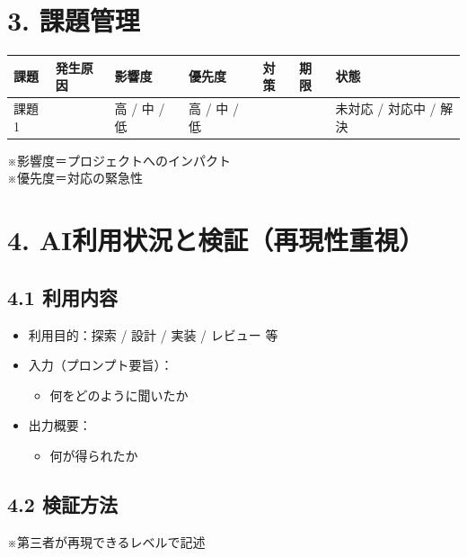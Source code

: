 \documentclass[a4paper,11pt]{ltjsarticle}
\begin{document}
\section{3. 課題管理}

\begin{longtable}{|p{2cm}|p{2.5cm}|p{1.5cm}|p{1.5cm}|p{3cm}|p{2cm}|p{2cm}|}
\hline
\rowcolor[gray]{0.9}
課題 & 発生原因 & 影響度 & 優先度 & 対策 & 期限 & 状態 \\
\hline
課題1 & & 高 / 中 / 低 & 高 / 中 / 低 & & & 未対応 / 対応中 / 解決 \\
\hline
\end{longtable}

\vspace{0.5em}
※影響度＝プロジェクトへのインパクト\\
※優先度＝対応の緊急性

\section{4. AI利用状況と検証（再現性重視）}

\subsection*{4.1 利用内容}

\begin{itemize}
    \item 利用目的：探索 / 設計 / 実装 / レビュー 等
    \item 入力（プロンプト要旨）：
    \begin{itemize}
        \item 何をどのように聞いたか
    \end{itemize}
    \item 出力概要：
    \begin{itemize}
        \item 何が得られたか
    \end{itemize}
\end{itemize}

\subsection*{4.2 検証方法}

※第三者が再現できるレベルで記述
\end{document}
